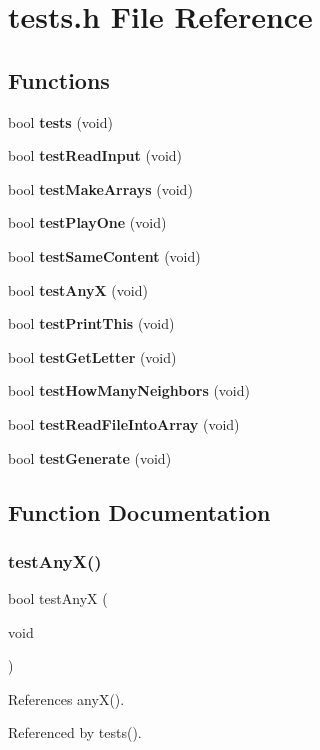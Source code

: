 \section{tests.\+h File Reference}
\label{tests_8h}
\subsection*{Functions}
\begin{DoxyCompactItemize}
\item 
bool \textbf{ tests} (void)
\item 
bool \textbf{ test\+Read\+Input} (void)
\item 
bool \textbf{ test\+Make\+Arrays} (void)
\item 
bool \textbf{ test\+Play\+One} (void)
\item 
bool \textbf{ test\+Same\+Content} (void)
\item 
bool \textbf{ test\+AnyX} (void)
\item 
bool \textbf{ test\+Print\+This} (void)
\item 
bool \textbf{ test\+Get\+Letter} (void)
\item 
bool \textbf{ test\+How\+Many\+Neighbors} (void)
\item 
bool \textbf{ test\+Read\+File\+Into\+Array} (void)
\item 
bool \textbf{ test\+Generate} (void)
\end{DoxyCompactItemize}


\subsection{Function Documentation}
\mbox{\label{tests_8h_a9136792bde961164c06bcdde7ab1d5f5}} 
\subsubsection{test\+Any\+X()}
{\footnotesize\ttfamily bool test\+AnyX (\begin{DoxyParamCaption}\item[{void}]{ }\end{DoxyParamCaption})}



References any\+X().



Referenced by tests().

\mbox{\label{tests_8h_a452bec98ef4419a18c4f15592208ee7b}} 
